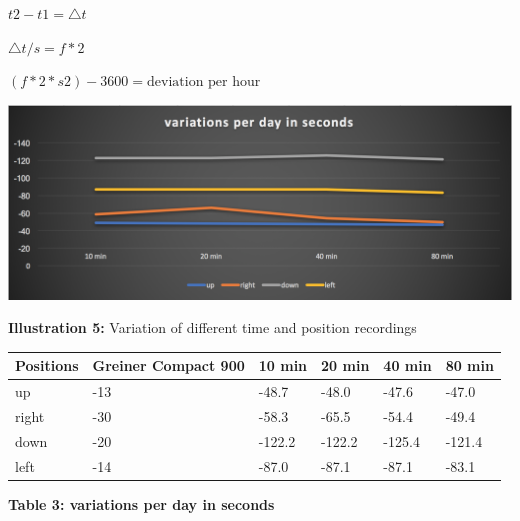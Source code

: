 \documentclass[12pt, a4paper]{report}
\begin{document}
\(t2-t1 = \triangle t\)

\(\triangle t / s = f*2\)

\((f*2*s2)-3600=\text{deviation per hour}\)

\begin{center}
    \includegraphics[scale=0.3]{Images/variations_per_day.png}
    
    {\bf Illustration 5:} Variation of different time and position recordings
    \end{center}
\begin{table}[H]
    \begin{tabular}{|l|l|l|l|l|l|}
    \hline
    Positions & Greiner Compact 900 & 10 min & 20 min & 40 min & 80 min \\ \hline
    up        & -13                 & -48.7     & -48.0     & -47.6      & -47.0      \\ \hline
    right     & -30                 & -58.3      & -65.5    & -54.4      & -49.4      \\ \hline
    down      & -20                 & -122.2    & -122.2     & -125.4    & -121.4      \\ \hline
    left      & -14                 & -87.0	   & -87.1	  & -87.1	  & -83.1      \\ \hline
    \end{tabular}
\end{table}
\begin{center}    
{\bf Table 3: variations per day in seconds} 
\end{center}

\bigskip
\end{document}
